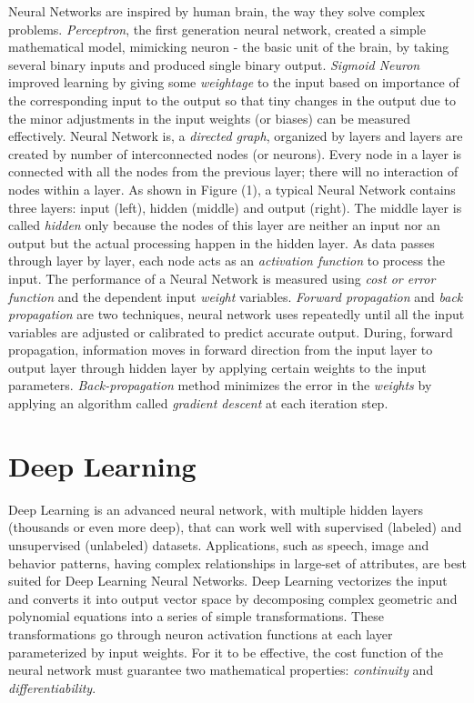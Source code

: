 \documentclass[sigconf]{acmart}
\begin{document}
	Neural Networks are inspired by human brain, the way they solve complex problems. {\em Perceptron}, the first generation neural network, created a simple mathematical model, mimicking neuron - the basic unit of the brain, by taking several binary inputs and produced single binary output. {\em Sigmoid Neuron} improved learning by giving some {\em weightage} to the input based on importance of the corresponding input to the output so that tiny changes in the output due to the minor adjustments in the input weights (or biases) can be measured effectively. Neural Network is, a {\em directed graph}, organized by layers and layers are created by number of interconnected nodes (or neurons). Every node in a layer is connected with all the nodes from the previous layer; there will no interaction of nodes within a layer. As shown in Figure (1), a typical Neural Network contains three layers: input (left), hidden (middle) and output (right). The middle layer is called {\em hidden} only because the nodes of this layer are neither an input nor an output but the actual processing happen in the hidden layer. As data passes through layer by layer, each node acts as an {\em activation function} to process the input. The performance of a Neural Network is measured using {\em cost or error function} and the dependent input {\em weight} variables. {\em Forward propagation} and {\em back propagation} are two techniques, neural network uses repeatedly until all the input variables are adjusted or calibrated to predict accurate output. During, forward propagation, information moves in forward direction from the input layer to output layer through hidden layer by applying certain weights to the input parameters. {\em Back-propagation} method minimizes the error in the {\em weights} by applying an algorithm called {\em gradient descent} at each iteration step. 
	
	\section{Deep Learning}
	
	Deep Learning is an advanced neural network, with multiple hidden layers (thousands or even more deep), that can work well with supervised (labeled) and unsupervised (unlabeled) datasets. Applications, such as speech, image and behavior patterns, having complex relationships in large-set of attributes, are best suited for Deep Learning Neural Networks. Deep Learning vectorizes the input and converts it into output vector space by decomposing complex geometric and polynomial equations into a series of simple transformations. These transformations go through neuron activation functions at each layer parameterized by input weights. For it to be effective, the cost function of the neural network must guarantee two mathematical properties: {\em continuity} and {\em differentiability}.
	
\end{document}
